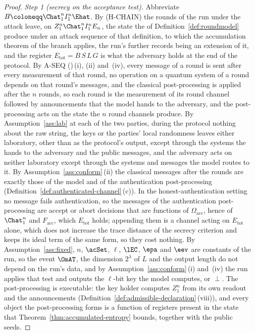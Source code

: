 \begin{proof}
\emph{Step 1 (secrecy on the acceptance test).} Abbreviate
$B\coloneqq\Chat_1^nI_1^n\Ehat$. By (H-CHAIN) the rounds of the run under the
attack leave, on $Z_1^n\Chat_1^nI_1^nE_n$, the state the
 of Definition~\ref{def:roundmodel}
produce under an attack sequence of that definition, to which the
accumulation theorem of the branch applies, the run's further records being
an extension of it, and
the register $E_{\mathrm{tot}}=B\,S\,L\,G$ is what the adversary holds at the
end of the protocol. By A-SEQ ()\,(i), (ii)
and~(iv), every message of a round is sent after every measurement of that
round, no operation on a quantum system of a round depends on that round's
messages, and the classical post-processing is applied after the $n$
rounds, so each round is the measurement of its round channel followed by
announcements that the model hands to the adversary, and the post-processing
acts on the state the $n$ round channels produce. By
Assumption~\ref{ass:lab} at each of the two parties, during the protocol
nothing about the raw string, the keys or the parties' local randomness
leaves either laboratory, other than as the protocol's output, except
through the systems the  hands to the adversary and the
public messages, and the adversary acts on neither laboratory except through
the systems and messages the model routes to it. By
Assumption~\ref{ass:conform}\,(ii) the classical messages after the rounds
are exactly those of the model and of the authentication post-processing
(Definition~\ref{def:authenticated-channel}\,(c)). In the
honest-authentication setting no message fails authentication, so the
messages of the authentication post-processing are accept or abort
decisions that are functions of $\Omega_{\mathrm{acc}}$, hence of
$\Chat_1^n$ and $F_{\mathrm{acc}}$, which $E_{\mathrm{tot}}$ holds;
appending them is a channel acting on $E_{\mathrm{tot}}$ alone, which does
not increase the trace distance of the secrecy criterion and keeps its ideal
term of the same form, so they cost nothing. By
Assumption~\ref{ass:fixed}, $n$, $\acSet$, $\ell$, $\lEC$, $\epa$ and $\eev$
are constants of the run, so the event $\OmAT$, the dimension $2^{\lambda}$
of $L$ and the output length do not depend on the run's data, and by
Assumption~\ref{ass:conform}\,(i) and~(iv) the run applies that test and
outputs the $\ell$-bit key the model computes, or $\perp$. The
post-processing is executable: the key holder computes $Z_1^n$ from its own
readout and the announcements (Definition~\ref{def:admissible-declaration}\,(viii)), and every
object the post-processing forms is a function of registers present in the
state that Theorem~\ref{thm:accumulated-entropy} bounds, together with the
public seeds.


\end{proof}

